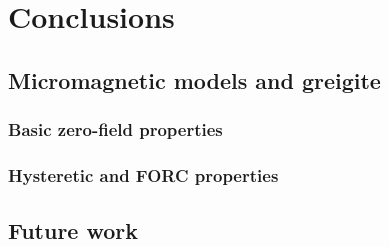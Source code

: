 \chapter{Conclusions}

\section{Micromagnetic models and greigite}

\subsection{Basic zero-field properties}

\subsection{Hysteretic and FORC properties}

\section{Future work}

\renewcommand\bibname{{References}}


